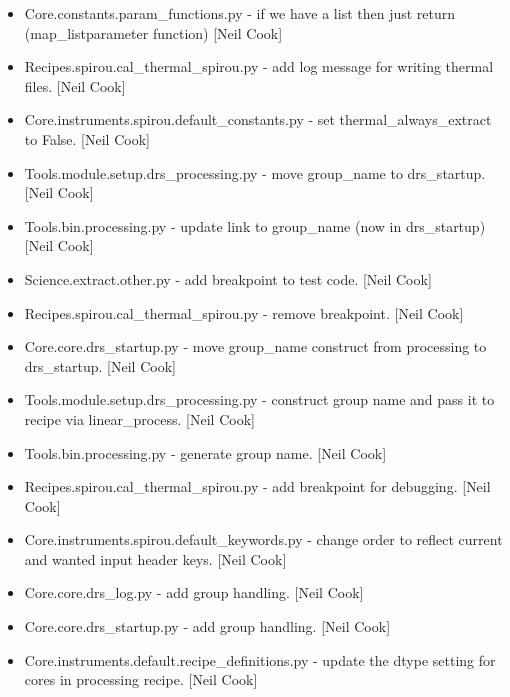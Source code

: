 \documentclass[a4paper,10pt,english]{report}
\begin{document}
\begin{itemize}
\item {} 
Core.constants.param\_functions.py - if we have a list then just return
(map\_listparameter function) {[}Neil Cook{]}

\item {} 
Recipes.spirou.cal\_thermal\_spirou.py - add log message for writing
thermal files. {[}Neil Cook{]}

\item {} 
Core.instruments.spirou.default\_constants.py - set
thermal\_always\_extract to False. {[}Neil Cook{]}

\item {} 
Tools.module.setup.drs\_processing.py - move group\_name to drs\_startup.
{[}Neil Cook{]}

\item {} 
Tools.bin.processing.py - update link to group\_name (now in
drs\_startup) {[}Neil Cook{]}

\item {} 
Science.extract.other.py - add breakpoint to test code. {[}Neil Cook{]}

\item {} 
Recipes.spirou.cal\_thermal\_spirou.py - remove breakpoint. {[}Neil Cook{]}

\item {} 
Core.core.drs\_startup.py - move group\_name construct from processing
to drs\_startup. {[}Neil Cook{]}

\item {} 
Tools.module.setup.drs\_processing.py - construct group name and pass
it to recipe via linear\_process. {[}Neil Cook{]}

\item {} 
Tools.bin.processing.py - generate group name. {[}Neil Cook{]}

\item {} 
Recipes.spirou.cal\_thermal\_spirou.py - add breakpoint for debugging.
{[}Neil Cook{]}

\item {} 
Core.instruments.spirou.default\_keywords.py - change order to reflect
current and wanted input header keys. {[}Neil Cook{]}

\item {} 
Core.core.drs\_log.py - add group handling. {[}Neil Cook{]}

\item {} 
Core.core.drs\_startup.py - add group handling. {[}Neil Cook{]}

\item {} 
Core.instruments.default.recipe\_definitions.py - update the dtype
setting for \textendash{}cores in processing recipe. {[}Neil Cook{]}


\end{itemize}
\end{document}
